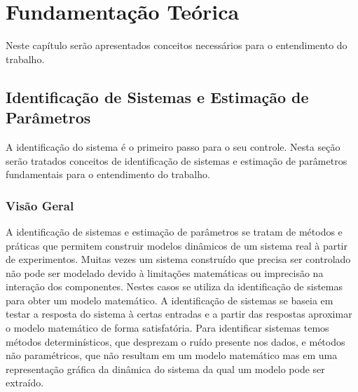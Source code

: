 \chapter{ Fundamentação Teórica} \label{cap2}
Neste capítulo serão apresentados conceitos necessários para o entendimento do trabalho.

\section{Identificação de Sistemas e Estimação de Parâmetros}
A identificação do sistema é o primeiro passo para o seu controle. Nesta seção serão tratados conceitos de identificação de sistemas e estimação de parâmetros fundamentais para o entendimento do trabalho.

\subsection{Visão Geral}
A identificação de sistemas e estimação de parâmetros se tratam de métodos e práticas que permitem construir modelos dinâmicos de um sistema real à partir de experimentos. Muitas vezes um sistema construído que precisa ser controlado não pode ser modelado devido à limitações matemáticas ou imprecisão na interação dos componentes. Nestes casos se utiliza da identificação de sistemas para obter um modelo matemático. A identificação de sistemas se baseia em testar a resposta do sistema à certas entradas e a partir das respostas aproximar o modelo matemático de forma satisfatória. Para identificar sistemas temos métodos determinísticos, que desprezam o ruído presente nos dados, e métodos não paramétricos, que não resultam em um modelo matemático mas em uma representação gráfica da dinâmica do sistema da qual um modelo pode ser extraído.



